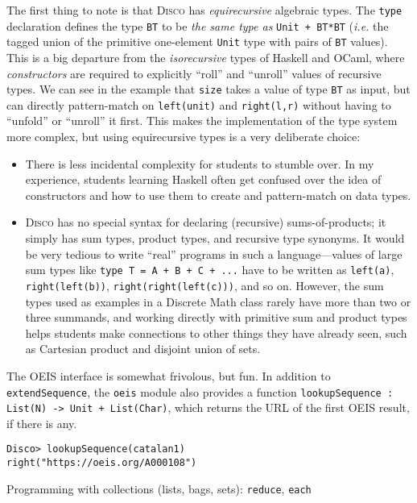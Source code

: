 \documentclass[submission,copyright,creativecommons]{eptcs}
\newcommand{\disco}{\textsc{Disco}\xspace}
\newcommand{\ie}{\emph{i.e.}\xspace}
\begin{document}
The first thing to note is that \disco has \emph{equirecursive}
algebraic types.  The \texttt{type} declaration defines the type
\texttt{BT} to be \emph{the same type as} \texttt{Unit + BT*BT} (\ie
the tagged union of the primitive one-element \texttt{Unit} type with
pairs of \texttt{BT} values).  This is a big departure from the
\emph{isorecursive} types of Haskell and OCaml, where
\emph{constructors} are required to explicitly ``roll'' and ``unroll''
values of recursive types.  We can see in the example that
\texttt{size} takes a value of type \texttt{BT} as input, but can
directly pattern-match on \texttt{left(unit)} and \texttt{right(l,r)}
without having to ``unfold'' or ``unroll'' it first.  This makes the
implementation of the type system more complex, but using
equirecursive types is a very deliberate choice:
\begin{itemize}
\item There is less incidental complexity for students to stumble
  over.  In my experience, students learning Haskell often get
  confused over the idea of constructors and how to use them to create
  and pattern-match on data types.
\item \disco has no special syntax for declaring
  (recursive) sums-of-products; it simply has sum types, product
  types, and recursive type synonyms. It would be very tedious to
  write ``real'' programs in such a language---values of large sum
  types like \texttt{type T = A + B + C + ...} have to be written as
  \texttt{left(a)}, \texttt{right(left(b))},
  \texttt{right(right(left(c)))}, and so on. However, the sum types
  used as examples in a Discrete Math class rarely have more than two
  or three summands, and working directly with primitive sum and
  product types helps students make connections to other things they
  have already seen, such as Cartesian product and disjoint union of sets.
\end{itemize}

The OEIS interface is somewhat frivolous, but fun.  In addition to
\texttt{extendSequence}, the \texttt{oeis} module also provides a
function \texttt{lookupSequence : List(N) -> Unit + List(Char)}, which
returns the URL of the first OEIS result, if there is any.
\begin{verbatim}
Disco> lookupSequence(catalan1)
right("https://oeis.org/A000108")
\end{verbatim}

Programming with collections (lists, bags, sets): \texttt{reduce}, \texttt{each}
\end{document}
